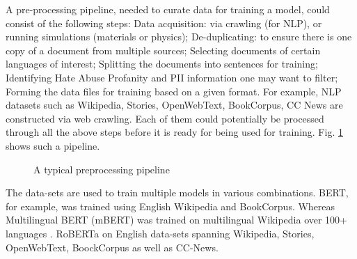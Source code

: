 A pre-processing pipeline, needed to curate data for training a model, could consist of the following steps: Data acquisition: via crawling (for NLP), or running simulations (materials or physics); De-duplicating:  to ensure there is one copy of a document from multiple sources; Selecting documents of certain languages of interest; Splitting the documents into sentences for training; Identifying Hate Abuse Profanity and PII information one may want to filter; Forming the data files for training based on a given format. For example, NLP datasets such as  Wikipedia,  Stories,  OpenWebText, BookCorpus, CC News are constructed via web crawling. 
Each of them could potentially be processed through all the above steps before it is ready for being used for training.  Fig. \ref{fig:model-preprocess} shows such a pipeline. 
 \begin{figure}[]
\caption{A typical preprocessing pipeline}
  \label{fig:model-preprocess}
\end{figure}
The data-sets are used to train multiple models in various combinations. BERT, for example, was trained using English Wikipedia and BookCorpus. Whereas Multilingual BERT (mBERT) was trained on multilingual Wikipedia over 100+ languages \cite{DBLP:journals/corr/abs-1911-03310}.   RoBERTa on English data-sets spanning Wikipedia, Stories, OpenWebText, BoockCorpus as well as CC-News.  
%


